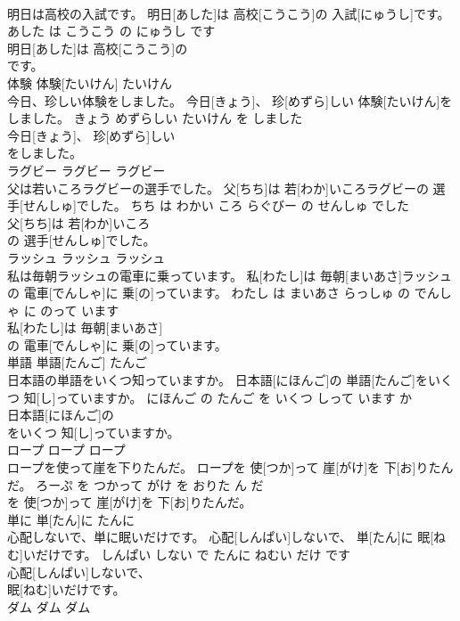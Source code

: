 \documentclass[8pt]{extreport}
\begin{document}
\begin{CJK}{UTF8}{min}
\\	明日は高校の入試です。	明日[あした]は 高校[こうこう]の 入試[にゅうし]です。	あした は こうこう の にゅうし です	
\\	明日[あした]は 高校[こうこう]の
\\	です。			
\\	体験	体験[たいけん]	たいけん	
\\	今日、珍しい体験をしました。	今日[きょう]、 珍[めずら]しい 体験[たいけん]をしました。	きょう めずらしい たいけん を しました	
\\	今日[きょう]、 珍[めずら]しい
\\	をしました。			
\\	ラグビー	ラグビー	ラグビー	
\\	父は若いころラグビーの選手でした。	父[ちち]は 若[わか]いころラグビーの 選手[せんしゅ]でした。	ちち は わかい ころ らぐびー の せんしゅ でした	
\\	父[ちち]は 若[わか]いころ
\\	の 選手[せんしゅ]でした。			
\\	ラッシュ	ラッシュ	ラッシュ	
\\	私は毎朝ラッシュの電車に乗っています。	私[わたし]は 毎朝[まいあさ]ラッシュの 電車[でんしゃ]に 乗[の]っています。	わたし は まいあさ らっしゅ の でんしゃ に のって います	
\\	私[わたし]は 毎朝[まいあさ]
\\	の 電車[でんしゃ]に 乗[の]っています。			
\\	単語	単語[たんご]	たんご	
\\	日本語の単語をいくつ知っていますか。	日本語[にほんご]の 単語[たんご]をいくつ 知[し]っていますか。	にほんご の たんご を いくつ しって います か	
\\	日本語[にほんご]の
\\	をいくつ 知[し]っていますか。			
\\	ロープ	ロープ	ロープ	
\\	ロープを使って崖を下りたんだ。	ロープを 使[つか]って 崖[がけ]を 下[お]りたんだ。	ろーぷ を つかって がけ を おりた ん だ	
\\	を 使[つか]って 崖[がけ]を 下[お]りたんだ。			
\\	単に	単[たん]に	たんに	
\\	心配しないで、単に眠いだけです。	心配[しんぱい]しないで、 単[たん]に 眠[ねむ]いだけです。	しんぱい しない で たんに ねむい だけ です	
\\	心配[しんぱい]しないで、
\\	眠[ねむ]いだけです。			
\\	ダム	ダム	ダム	

\end{CJK}
\end{document}
